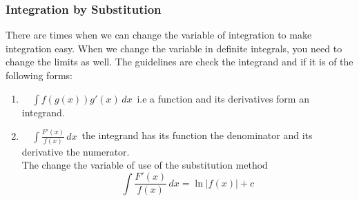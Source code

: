 \documentclass[11pt,a4paper]{article}
\theoremstyle{definition}
\begin{document}
\subsubsection{Integration by Substitution}
There are times when we can change the variable of integration to make integration easy. When we change the variable in definite integrals, you need to change the limits as well. The guidelines are check the integrand and if it is of the following forms:
\begin{enumerate}
\item $\quad \displaystyle{\int f\left(g(x)\right)g'(x)\,dx\,}$ i.e a function and its derivatives form an integrand.\\

\item $\quad \displaystyle{\int\frac{F'(x)}{f(x)}\,dx\,}$ the integrand has its function the denominator and its derivative the numerator.\\

The change the variable of use of the substitution method $$\int \frac{F'(x)}{f(x)}\,dx = \ln \left|f(x)\right| + c$$\\
\end{enumerate}
\end{document}
